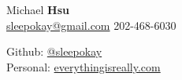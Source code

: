 \documentclass[]{deedy-resume-openfont}
\begin{document}
\begin{minipage}[t]{.6\textwidth}
\vspace{.0pt}
{\Huge Michael {\textbf{Hsu}}}
\vspace{4pt}\\
\href{mailto:sleepokay@gmail.com}{sleepokay@gmail.com} \textbullet{} 202-468-6030
\end{minipage}
\hfill
\begin{minipage}[t]{.3\textwidth}
\vspace{\topsep}
Github: \href{https://github.com/sleepokay}{@sleepokay}\\
Personal: \href{http://everythingisreally.com}{everythingisreally.com}
\end{minipage}
\namesection{}{} %

\vspace{\topsep} %


\vspace{\topsep} %

\end{document}
